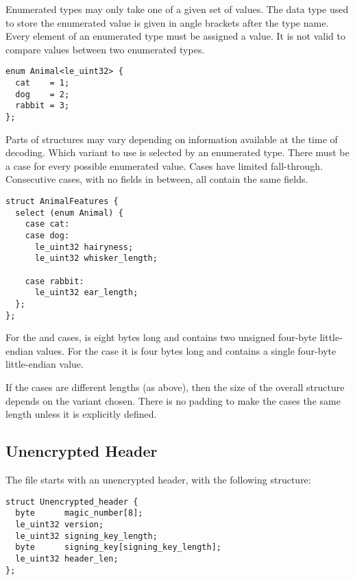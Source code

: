 Enumerated types may only take one of a given set of values.
%
The data type used to store the enumerated value is given in angle
brackets after the type name.
%
Every element of an enumerated type must be assigned a value.
%
It is not valid to compare values between two enumerated types.

\begin{verbatim}
enum Animal<le_uint32> {
  cat    = 1;
  dog    = 2;
  rabbit = 3;
};
\end{verbatim}

Parts of structures may vary depending on information available at the time of decoding.
%
Which variant to use is selected by an enumerated type.
%
There must be a case for every possible enumerated value.
%
Cases have limited fall-through.
%
Consecutive cases, with no fields in between, all contain the same fields.

\begin{verbatim}
struct AnimalFeatures {
  select (enum Animal) {
    case cat:
    case dog:
      le_uint32 hairyness;
      le_uint32 whisker_length;

    case rabbit:
      le_uint32 ear_length;
  };
};
\end{verbatim}

For the  and  cases,  is
eight bytes long and contains two unsigned four-byte little-endian
values.
%
For the  case it is four bytes long and contains a single
four-byte little-endian value.

If the cases are different lengths (as above), then the size of the
overall structure depends on the variant chosen.
%
There is no padding to make the cases the same length unless it is
explicitly defined.

\subsection{Unencrypted Header}\label{unencrypted:header}

The file starts with an unencrypted header, with the following structure:

\begin{verbatim}
struct Unencrypted_header {
  byte      magic_number[8];
  le_uint32 version;
  le_uint32 signing_key_length;
  byte      signing_key[signing_key_length];
  le_uint32 header_len;
};
\end{verbatim}

